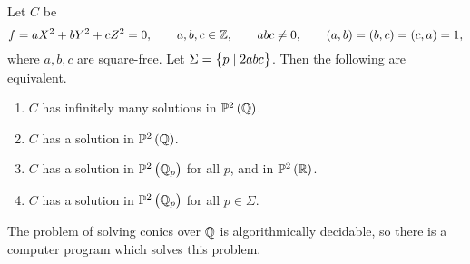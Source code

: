 
\begin{theorem}
Let $ C $ be
$$ f = aX^2 + bY^2 + cZ^2 = 0, \qquad a, b, c \in \ZZ, \qquad abc \ne 0, \qquad \br{a, b} = \br{b, c} = \br{c, a} = 1, $$
where $ a, b, c $ are square-free. Let $ \Sigma = \cbr{p \mid 2abc} $. Then the following are equivalent.
\begin{enumerate}
\item $ C $ has infinitely many solutions in $ \PP^2\br{\QQ} $.
\item $ C $ has a solution in $ \PP^2\br{\QQ} $.
\item $ C $ has a solution in $ \PP^2\br{\QQ_p} $ for all $ p $, and in $ \PP^2\br{\RR} $.
\item $ C $ has a solution in $ \PP^2\br{\QQ_p} $ for all $ p \in \Sigma $.
\end{enumerate}
\end{theorem}

The problem of solving conics over $ \mathbb{Q} $ is algorithmically decidable, so there is a computer program which solves this problem.

\pagebreak

